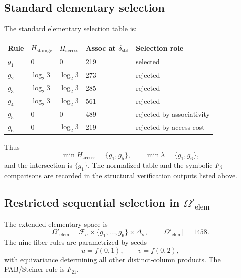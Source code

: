\documentclass[11pt]{article}
\begin{document}
\subsection{Standard elementary selection}

The standard elementary selection table is:

\begin{center}
\small
\begin{tabular}{@{}lllll@{}}
\toprule
Rule & \(H_{\mathrm{storage}}\) & \(H_{\mathrm{access}}\) & Assoc at \(\delta_{\mathrm{std}}\) & Selection role \\
\midrule
\(g_1\) & 0 & 0 & 219 & selected \\
\(g_2\) & \(\log_2 3\) & \(\log_2 3\) & 273 & rejected \\
\(g_3\) & \(\log_2 3\) & \(\log_2 3\) & 285 & rejected \\
\(g_4\) & \(\log_2 3\) & \(\log_2 3\) & 561 & rejected \\
\(g_5\) & 0 & 0 & 489 & rejected by associativity \\
\(g_6\) & 0 & \(\log_2 3\) & 219 & rejected by access cost \\
\bottomrule
\end{tabular}
\end{center}

Thus
\[
\min H_{\mathrm{access}}=\{g_1,g_5\},
\qquad
\min\lambda=\{g_1,g_6\},
\]
and the intersection is \(\{g_1\}\). The normalized table and the symbolic \(F_\beta\)-comparisons are recorded in the structural verification outputs listed above.

\subsection{Restricted sequential selection in \texorpdfstring{\(\Omega'_{\mathrm{elem}}\)}{Omega-prime-elem}}

The extended elementary space is
\[
\Omega'_{\mathrm{elem}}
=\mathcal F_\sigma\times\{g_1,\ldots,g_6\}\times\Delta_\sigma,
\qquad |\Omega'_{\mathrm{elem}}|=1458.
\]
The nine fiber rules are parametrized by seeds
\[
u=f(0,1),\qquad v=f(0,2),
\]
with equivariance determining all other distinct-column products. The
PAB/Steiner rule is \(F_{21}\).
\end{document}
